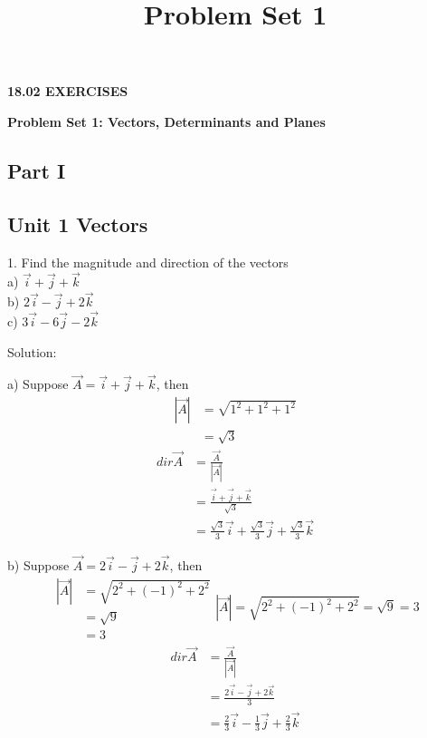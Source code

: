 \documentclass{article}
\title{Problem Set 1}
\author{}
\date{}
\begin{document}
\begin{center}
{\rmfamily\bfseries\Large 18.02 EXERCISES}

\vspace{25px}

{\rmfamily\bfseries\LARGE Problem Set 1: Vectors, Determinants and Planes}
\end{center}

\begin{center}
\section*{Part I}
\end{center}

\subsection*{Unit 1 Vectors}

1. Find the magnitude and direction of the vectors \\
a) $\vec{i} + \vec{j} + \vec{k}$ \\
b) $2\vec{i} - \vec{j} + 2\vec{k}$ \\
c) $3\vec{i} - 6\vec{j} - 2\vec{k}$

Solution:

a) Suppose $\vec{A} = \vec{i} + \vec{j} + \vec{k}$, then
\[
  \begin{split}
    |\vec{A}| &= \sqrt{1^2 + 1^2 + 1^2} \\
              &= \sqrt{3}
  \end{split}
\]
\[
  \begin{split}
    dir \vec{A} &= \frac{\vec{A}}{|\vec{A}|} \\
                &= \frac{\vec{i} + \vec{j} + \vec{k}}{\sqrt{3}} \\
                &= \frac{\sqrt{3}}{3}\vec{i} + \frac{\sqrt{3}}{3}\vec{j} + \frac{\sqrt{3}}{3}\vec{k}
  \end{split}
\]

b) Suppose $\vec{A} = 2\vec{i} - \vec{j} + 2\vec{k}$, then
\[
  \begin{split}
    |\vec{A}| &= \sqrt{2^2 + (-1)^2 + 2^2} \\
              &= \sqrt{9} \\
              &= 3
  \end{split}
  |\vec{A}| = \sqrt{2^2 + (-1)^2 + 2^2} = \sqrt{9} = 3
\]
\[
  \begin{split}
    dir \vec{A} &= \frac{\vec{A}}{|\vec{A}|} \\
                &= \frac{2\vec{i} - \vec{j} + 2\vec{k}}{3} \\
                &= \frac{2}{3}\vec{i} - \frac{1}{3}\vec{j} + \frac{2}{3}\vec{k}
  \end{split}
\]
\end{document}
